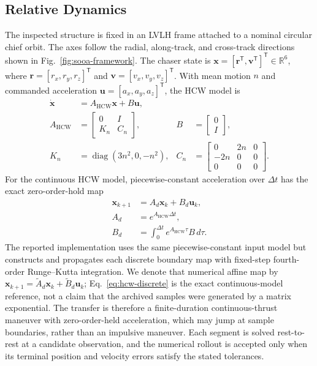 \documentclass{IEEEtaes}
\newcommand{\R}{\mathbb{R}}
\newcommand{\dt}{\Delta t}
\theoremstyle{remark}
\theoremstyle{plain}
\begin{document}
\subsection{Relative Dynamics}

The inspected structure is fixed in an LVLH frame attached to a nominal circular chief orbit. The axes follow the radial, along-track, and cross-track directions shown in Fig.~\ref{fig:sooa-framework}. The chaser state is $\mathbf{x}=[\mathbf{r}^{\mathsf T},\mathbf{v}^{\mathsf T}]^{\mathsf T}\in\R^6$, where $\mathbf r=[r_x,r_y,r_z]^{\mathsf T}$ and $\mathbf v=[v_x,v_y,v_z]^{\mathsf T}$. With mean motion $n$ and commanded acceleration $\mathbf{u}=[a_x,a_y,a_z]^{\mathsf T}$, the HCW model is
\begin{equation}
  \begin{aligned}
  \dot{\mathbf{x}}&=A_{\mathrm{HCW}}\mathbf{x}+B\mathbf{u},\\
  A_{\mathrm{HCW}}&=\begin{bmatrix}0&I\\K_n&C_n\end{bmatrix},
  &B&=\begin{bmatrix}0\\I\end{bmatrix},\\
  K_n&=\operatorname{diag}(3n^2,0,-n^2),
  &C_n&=\begin{bmatrix}0&2n&0\\-2n&0&0\\0&0&0\end{bmatrix}.
  \end{aligned}
  \label{eq:hcw-continuous}
\end{equation}
For the continuous HCW model, piecewise-constant acceleration over $\dt$ has the exact zero-order-hold map
\begin{equation}
  \begin{aligned}
  \mathbf{x}_{k+1}&=A_d\mathbf{x}_k+B_d\mathbf{u}_k,\\
  A_d&=e^{A_{\mathrm{HCW}}\dt},\\
  B_d&=\int_0^{\dt}e^{A_{\mathrm{HCW}}\tau}B\,d\tau.
  \end{aligned}
  \label{eq:hcw-discrete}
\end{equation}
The reported implementation uses the same piecewise-constant input model but constructs and propagates each discrete boundary map with fixed-step fourth-order Runge--Kutta integration. We denote that numerical affine map by $\mathbf x_{k+1}=\widetilde A_d\mathbf x_k+\widetilde B_d\mathbf u_k$; Eq.~\eqref{eq:hcw-discrete} is the exact continuous-model reference, not a claim that the archived samples were generated by a matrix exponential. The transfer is therefore a finite-duration continuous-thrust maneuver with zero-order-held acceleration, which may jump at sample boundaries, rather than an impulsive maneuver. Each segment is solved rest-to-rest at a candidate observation, and the numerical rollout is accepted only when its terminal position and velocity errors satisfy the stated tolerances.
\end{document}
